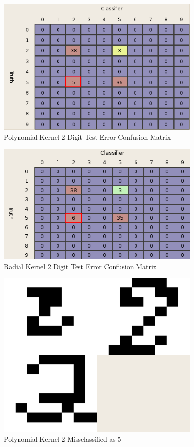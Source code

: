 \documentclass{article}
\begin{document}
\begin{figure}
\centering
\includegraphics[width=0.9\textwidth]{images/test2_5_confusion_a0156.png}
\caption{Polynomial Kernel 2 Digit Test Error Confusion Matrix}
\label{poly2testconfusion}
\end{figure}

\begin{figure}
\centering
\includegraphics[width=0.9\textwidth]{images/test2_5_confusion_radial.png}
\caption{Radial Kernel 2 Digit Test Error Confusion Matrix}
\label{radial2testconfusion}
\end{figure}

\begin{figure}
\centering
\includegraphics[width=0.9\textwidth]{images/test2_5_correct2_class5_a0156.png}
\caption{Polynomial Kernel 2 Missclassified as 5}
\label{poly2errortest}
\end{figure}
\end{document}
